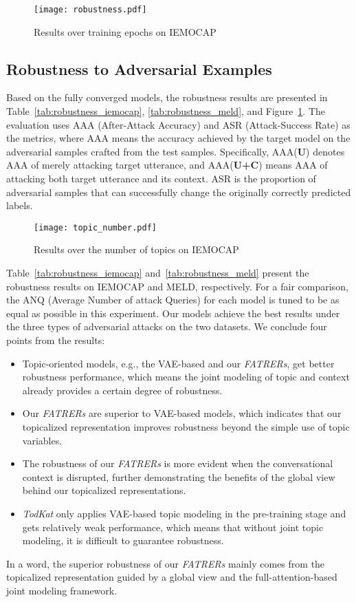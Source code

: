 \documentclass{ecai}
\begin{document}
\begin{figure}[t]
\centering
    \texttt{[image: robustness.pdf]}
    \caption{Results over training epochs on IEMOCAP}
    \label{fig:robustness}
\end{figure}

\subsection{Robustness to Adversarial Examples}
Based on the fully converged models, the robustness results are presented in Table~\ref{tab:robustness_iemocap}, \ref{tab:robustness_meld}, and Figure~\ref{fig:robustness}. The evaluation uses AAA (After-Attack Accuracy) and ASR (Attack-Success Rate) as the metrics, where AAA means the accuracy achieved by the target model on the adversarial samples crafted from the test samples. Specifically, AAA(\textbf{U}) denotes AAA of merely attacking target utterance, and AAA(\textbf{U+C}) means AAA of attacking both target utterance and its context. ASR is the proportion of adversarial samples that can successfully change the originally correctly predicted labels.

\begin{figure}[t]
    \centering
    \texttt{[image: topic\_number.pdf]}
    \caption{Results over the number of topics on IEMOCAP}
    \label{fig:topic_number}
\end{figure}

Table~\ref{tab:robustness_iemocap} and~\ref{tab:robustness_meld} present the robustness results on IEMOCAP and MELD, respectively. For a fair comparison, the ANQ (Average Number of attack Queries) for each model is tuned to be as equal as possible in this experiment. Our models achieve the best results under the three types of adversarial attacks on the two datasets. We conclude four points from the results:
\begin{itemize}
  \item [1)] 
  Topic-oriented models, e.g., the VAE-based and our \textit{FATRERs}, get better robustness performance, which means the joint modeling of topic and context already provides a certain degree of robustness.    
  \item [2)]
  Our \textit{FATRERs} are superior to VAE-based models, which indicates that our topicalized representation improves robustness beyond the simple use of topic variables.  
  \item [3)]
  The robustness of our \textit{FATRERs} is more evident when the conversational context is disrupted, further demonstrating the benefits of the global view behind our topicalized representations. 
  \item [4)]
  \textit{TodKat} only applies VAE-based topic modeling in the pre-training stage and gets relatively weak performance, which means that without joint topic modeling, it is difficult to guarantee robustness.
\end{itemize}
In a word, the superior robustness of our \textit{FATRERs} mainly comes from the topicalized representation guided by a global view and the full-attention-based joint modeling framework.
\end{document}
